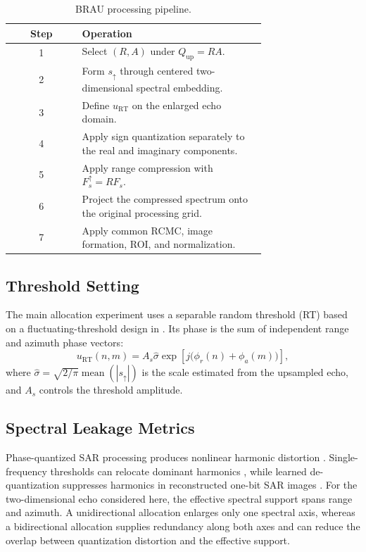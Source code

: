 \documentclass[conference]{IEEEtran}
\begin{document}
\begin{table}[t]
\caption{BRAU processing pipeline.}
\label{tab:brau_pipeline}
\centering
\scriptsize
\setlength{\tabcolsep}{3pt}
\begin{tabular}{c p{0.72\linewidth}}
\hline
Step & Operation \\
\hline
1 & Select $(R,A)$ under $Q_{\mathrm{up}}=RA$. \\
2 & Form $s_{\uparrow}$ through centered two-dimensional spectral embedding. \\
3 & Define $u_{\mathrm{RT}}$ on the enlarged echo domain. \\
4 & Apply sign quantization separately to the real and imaginary components. \\
5 & Apply range compression with $F_s^{\uparrow}=RF_s$. \\
6 & Project the compressed spectrum onto the original processing grid. \\
7 & Apply common RCMC, image formation, ROI, and normalization. \\
\hline
\end{tabular}
\end{table}

\subsection{Threshold Setting}

The main allocation experiment uses a separable random threshold (RT) based on a fluctuating-threshold design in \cite{nie2025fixed}. Its phase is the sum of independent range and azimuth phase vectors:
\begin{equation}
    u_{\mathrm{RT}}(n,m)
    =A_s\hat{\sigma}\exp\!\left[j\bigl(\phi_r(n)+\phi_a(m)\bigr)\right],
\end{equation}
where $\hat{\sigma}=\sqrt{2/\pi}\operatorname{mean}(|s_{\uparrow}|)$ is the scale estimated from the upsampled echo, and $A_s$ controls the threshold amplitude.

\subsection{Spectral Leakage Metrics}

Phase-quantized SAR processing produces nonlinear harmonic distortion \cite{franceschetti1999phase}. Single-frequency thresholds can relocate dominant harmonics \cite{zhao2019onebit}, while learned de-quantization suppresses harmonics in reconstructed one-bit SAR images \cite{si2023dequantization}. For the two-dimensional echo considered here, the effective spectral support spans range and azimuth. A unidirectional allocation enlarges only one spectral axis, whereas a bidirectional allocation supplies redundancy along both axes and can reduce the overlap between quantization distortion and the effective support.
\end{document}
